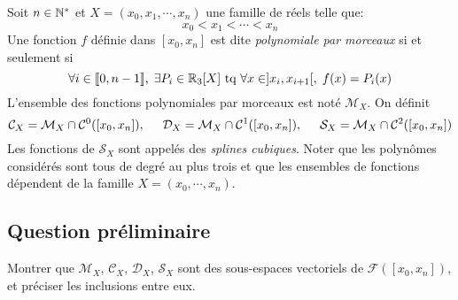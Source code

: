 \noindent Soit $n\in \mathbb{N}^*$ et $X=(x_0, x_1, \cdots, x_n)$ une famille de réels telle que:
\begin{displaymath}
   x_0 < x_1 < \cdots < x_n 
\end{displaymath}
Une fonction $f$ définie dans $[x_0, x_n]$ est dite \emph{polynomiale par morceaux} si et seulement si
\begin{displaymath}
  \forall i \in \llbracket 0,n-1\rrbracket, \; \exists P_i \in \mathbb{R}_3[X] \text{ tq } \forall x\in ]x_i, x_{i+1}[,\; f(x) = P_i(x) 
\end{displaymath}
L'ensemble des fonctions polynomiales par morceaux est noté $\mathcal{M}_X$.\newline
On définit
\begin{displaymath}
\mathcal{C}_X = \mathcal{M}_X \cap \mathcal{C}^0([x_0,x_n]), \hspace{0.5cm}
\mathcal{D}_X = \mathcal{M}_X \cap \mathcal{C}^1([x_0,x_n]), \hspace{0.5cm}
\mathcal{S}_X = \mathcal{M}_X \cap \mathcal{C}^2([x_0,x_n])  
\end{displaymath}
Les fonctions de $\mathcal{S}_X$ sont appelés des \emph{splines cubiques}.\newline
Noter que les polynômes considérés sont tous de degré au plus trois et que les ensembles de fonctions dépendent de la famille $X=(x_0,\cdots,x_n)$.

\subsection*{Question préliminaire}
Montrer que $\mathcal{M}_X$, $\mathcal{C}_X$, $\mathcal{D}_X$, $\mathcal{S}_X$ sont des sous-espaces vectoriels de $\mathcal{F}([x_0,x_n])$, et préciser les inclusions entre eux.  

